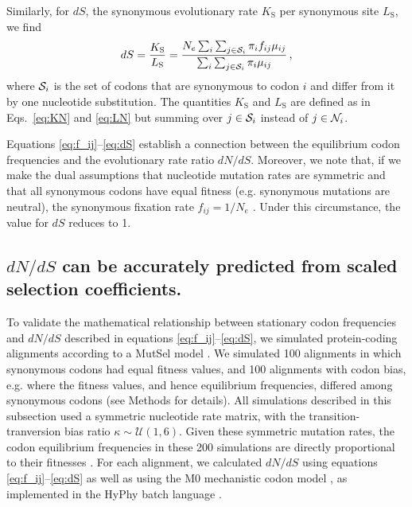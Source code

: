 \documentclass{pnastwo}
\begin{document}
\begin{article}
Similarly, for $dS$, the synonymous evolutionary rate $K_\text{S}$ per synonymous site $L_\text{S}$, we find
\begin{equation}\label{eq:dS}
  dS = \frac{K_\text{S}}{L_\text{S}}=\frac{ N_e \sum_i \sum_{j \in {\cal S}_i} \pi_i f_{ij} \mu_{ij} } {\sum_i \sum_{j \in {\cal S}_i} \pi_i \mu_{ij} }\,,
\end{equation}
where ${\cal S}_i$ is the set of codons that are synonymous to codon $i$ and differ from it by one nucleotide substitution. The quantities $K_\text{S}$ and $L_\text{S}$ are defined as in Eqs.~\eqref{eq:KN} and \eqref{eq:LN} but summing over $j\in {\cal S}_i$ instead of $j\in {\cal N}_i$.

Equations \eqref{eq:f_ij}--\eqref{eq:dS} establish a connection between the equilibrium codon frequencies and the evolutionary rate ratio $dN/dS$. Moreover, we note that, if we make the dual assumptions that nucleotide mutation rates are symmetric and that all synonymous codons have equal fitness (e.g. synonymous mutations are neutral), the synonymous fixation rate $f_{ij}= 1/N_e$ \cite{CrowKimura1970}. Under this circumstance, the value for $dS$ reduces to 1.

\subsection*{$dN/dS$ can be accurately predicted from scaled selection coefficients.}

To validate the mathematical relationship between stationary codon frequencies and $dN/dS$ described in equations \eqref{eq:f_ij}--\eqref{eq:dS}, we simulated protein-coding alignments according to a MutSel model \cite{HalpernBruno1998,SellaHirsh2005}. We simulated 100 alignments in which synonymous codons had equal fitness values, and 100 alignments with codon bias, e.g. where the fitness values, and hence equilibrium frequencies, differed among synonymous codons (see Methods for details). All simulations described in this subsection used a symmetric nucleotide rate matrix, with the transition-tranversion bias ratio $\kappa \sim \mathcal{U}(1,6)$. Given these symmetric mutation rates, the codon equilibrium frequencies in these 200 simulations are directly proportional to their fitnesses \cite{SellaHirsh2005}. For each alignment, we calculated $dN/dS$ using equations \eqref{eq:f_ij}--\eqref{eq:dS} as well as using the M0 mechanistic codon model \cite{NielsenYang1998}, as implemented in the HyPhy batch language \cite{KosakovskyPondetal2005}.


\end{article}
\end{document}
